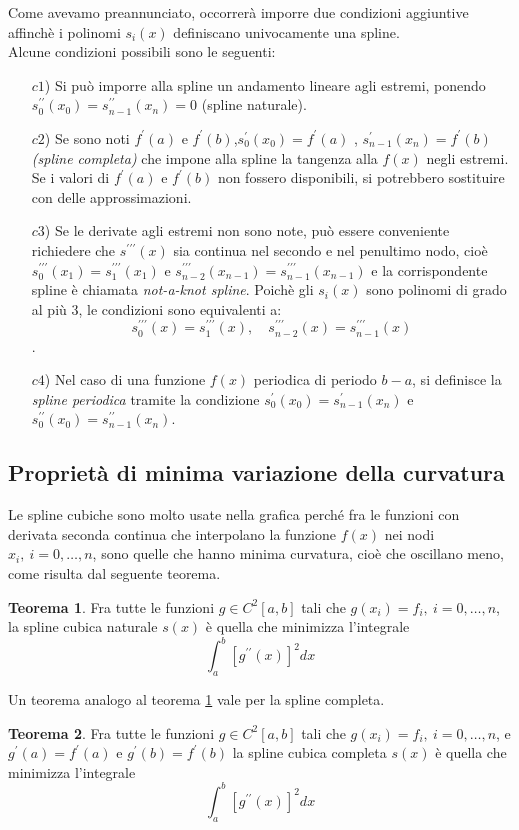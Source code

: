 \documentclass[a4paper,12pt]{report}
\theoremstyle{definition}
\newtheorem{thrm}{Teorema}[chapter]
\begin{document}
Come avevamo preannunciato, occorrerà imporre due condizioni aggiuntive affinchè i polinomi $s_i(x)$ definiscano univocamente una spline.\\
Alcune condizioni possibili sono le seguenti:
\begin{itemize}
	\item[$c1$)] Si può imporre alla spline un andamento lineare agli estremi, ponendo $s_0^{\prime \prime}(x_0) = s_{n-1}^{\prime \prime}(x_n)=0$ (spline naturale).
	\item[$c2$)] Se sono noti $f^\prime(a)$ e $f^\prime(b)$,$s_0^{\prime}(x_0) = f^\prime(a)$ , $s_{n-1}^{\prime}(x_n) = f^\prime(b)$ \textit{(spline completa)} che impone alla spline la tangenza alla $f(x)$ negli estremi. Se i valori di $f^\prime(a)$ e $f^\prime(b)$ non fossero disponibili, si potrebbero sostituire con delle approssimazioni.
	\item[$c3$)] Se le derivate agli estremi non sono note, può essere conveniente richiedere che $s^{\prime \prime \prime}(x)$ sia continua nel secondo e nel penultimo nodo, cioè $s_0^{\prime \prime \prime}(x_1) = s_1^{\prime \prime \prime}(x_1)$ e $s_{n-2}^{\prime \prime \prime}(x_{n-1}) = s_{n-1}^{\prime \prime \prime}(x_{n-1})$ e la corrispondente spline è chiamata \textit{not-a-knot spline}. Poichè gli $s_i(x)$ sono polinomi di grado al più 3, le condizioni sono equivalenti a: $$s_0^{\prime \prime \prime}(x) = s_1^{\prime \prime \prime}(x), \quad  s_{n-2}^{\prime \prime \prime}(x) = s_{n-1}^{\prime \prime \prime}(x)$$.
	\item[$c4$)] Nel caso di una funzione $f(x)$ periodica di periodo $b-a$, si definisce la \textit{spline periodica} tramite la condizione $s_0^\prime(x_0) = s_{n-1}^\prime(x_n)$ e $s_0^{\prime \prime}(x_0) = s_{n-1}^{\prime \prime}(x_n)$.
\end{itemize}

\subsection{Proprietà di minima variazione della curvatura}
Le spline cubiche sono molto usate nella grafica perché fra le funzioni con derivata
seconda continua che interpolano la funzione $f(x)$ nei nodi $x_i,\ i = 0, \ldots, n$, sono quelle che hanno minima curvatura, cioè che oscillano meno, come risulta dal
seguente teorema.
\begin{thrm}\label{min_cur}
	Fra tutte le funzioni $g\in C^2 [a,b]$ tali che $g(x_i) = f_i,\ i = 0, \ldots, n$, la spline cubica naturale $s(x)$ è quella che minimizza l'integrale $$\int_{a}^{b}[g^{\prime \prime}(x)]^2 dx$$
\end{thrm}
Un teorema analogo al teorema \ref{min_cur} vale per la spline completa.
\begin{thrm}\label{min_cur_spline_completa}
	Fra tutte le funzioni $g\in C^2 [a,b]$ tali che $g(x_i) = f_i,\ i = 0, \ldots, n$, e $g^\prime(a) = f^\prime(a) $ e $ g^\prime(b) = f^\prime(b)$ la spline cubica completa $s(x)$ è quella che minimizza l'integrale $$\int_{a}^{b}[g^{\prime \prime}(x)]^2 dx$$
\end{thrm}
\end{document}
